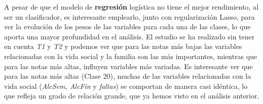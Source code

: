 \documentclass{article}
\begin{document}
A pesar de que el modelo de \textbf{regresión} logística no tiene el mejor rendimiento, al ser un clasificador, es interesante emplearlo, junto con regularización Lasso, para ver la evolución de los pesos de las variables para cada una de las clases, lo que aporta una mayor profundidad en el análisis.
El estudio se ha realizado sin tener en cuenta \textit{T1} y \textit{T2} y podemos ver que para las notas más bajas las variables relacionadas con la vida social y la familia son las más importantes, mientras que para las notas más altas, influyen variables más variadas.
Es interesante ver que para las notas más altas (Clase 20), muchas de las variables relacionadas con la vida social (\textit{AlcSem, AlcFin} y \textit{faltas}) se comportan de manera casi idéntica, lo que refleja un grado de relación grande, que ya hemos visto en el análisis anterior.
\end{document}
